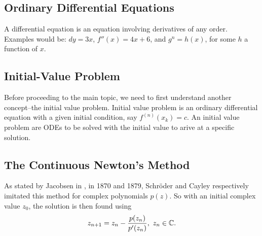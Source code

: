 \subsection{Ordinary Differential Equations}

A differential equation is an equation involving derivatives of any order. Examples would be: $dy = 3x$, $f''(x) = 4x+6$, and $g^{n} = h(x)$, for some $h$ a function of $x$.
\\

\subsection{Initial-Value Problem}

Before proceeding to the main topic, we need to first understand another concept--the initial value problem. Initial value problem is an ordinary differential equation with a given initial condition, say $f^{(n)}(x_k) = c$. An initial value problem are ODEs to be solved with the initial value to arive at a specific solution.


\subsection{The Continuous Newton's Method}


As stated by Jacobsen in \cite{jacobsen}, in 1870 and 1879, Schr\"oder and Cayley respectively imitated this method for complex polynomials $p(z)$. So with an initial complex value $z_0$, the solution is then found using
\begin{equation}
	z_{n+1} = z_{n} - \displaystyle\frac{p(z_n)}{p'(z_n)},\ z_n \in \mathbb{C}.
\end{equation}

